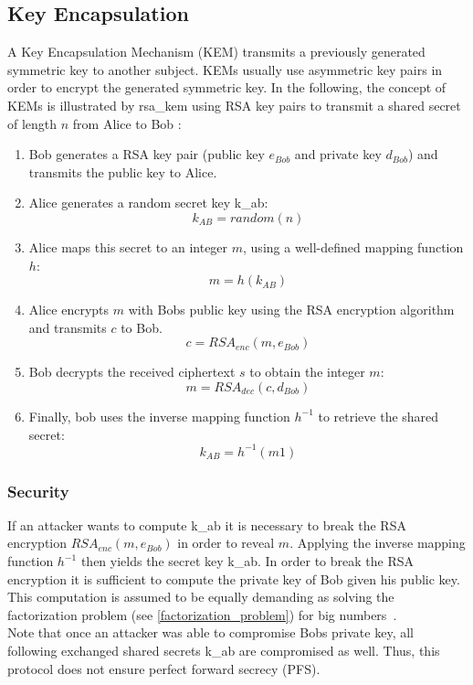 \subsection{Key Encapsulation}

A Key Encapsulation Mechanism (\gls{KEM}) transmits a previously generated symmetric key to another subject. \glspl{KEM} usually use asymmetric key pairs in order to encrypt the generated symmetric key. In the following, the concept of \glspl{KEM} is illustrated by  \gls{rsa_kem} using \gls{RSA} key pairs to transmit a shared secret of length $n$ from Alice to Bob \parencite{rsakem}:

\begin{enumerate}
\item Bob generates a \gls{RSA} key pair (public key $e_{Bob}$ and private key $d_{Bob}$) and transmits the public key to Alice.
\item Alice generates a random secret key \gls{k_ab}:
\begin{equation*}
k_{AB} = random(n)
\end{equation*}
\item Alice maps this secret to an integer $m$, using a well-defined mapping function $h$:
\begin{equation*}
m = h(k_{AB})
\end{equation*}
\item Alice encrypts $m$ with Bobs public key using the \gls{RSA} encryption algorithm and transmits $c$ to Bob.
\begin{equation*}
c = RSA_{enc}(m, e_{Bob})
\end{equation*}
\item Bob decrypts the received ciphertext $s$ to obtain the integer $m$:
\begin{equation*}
m = RSA_{dec}(c, d_{Bob})
\end{equation*}
\item Finally, bob uses the inverse mapping function $h^{-1}$ to retrieve the shared secret:
\begin{equation*}
k_{AB} = h^{-1}(m1)
\end{equation*}

\end{enumerate}

\subsubsection{Security}
If an attacker wants to compute \gls{k_ab} it is necessary to break the \gls{RSA} encryption $RSA_{enc}(m, e_{Bob})$ in order to reveal $m$. Applying the inverse mapping function $h^{-1}$ then yields the secret key \gls{k_ab}. In order to break the \gls{RSA} encryption it is sufficient to compute the private key of Bob given his public key. This computation is assumed to be equally demanding as solving the factorization problem (see \autoref{factorization_problem}) for big numbers~\parencite{rsa2005problem}.\\
Note that once an attacker was able to compromise Bobs private key, all following exchanged shared secrets \gls{k_ab} are compromised as well. Thus, this protocol does not ensure perfect forward secrecy (\gls{PFS}).

